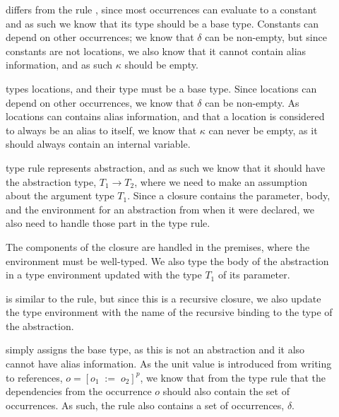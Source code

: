 \documentclass[acmsmall,sigplan]{acmart}
\begin{document}
\begin{description}
\item[] differs from the rule , since
  most occurrences can evaluate to a constant and as such we know that
  its type should be a base type. Constants can depend on other
  occurrences; we know that $\delta$ can be non-empty, but since
  constants are not locations, we also know that it cannot contain
  alias information, and as such $\kappa$ should be empty.

\item[] types locations, and their type must be a base
  type. Since locations can depend on other occurrences, we know that
  $\delta$ can be non-empty.  As locations can contains alias
  information, and that a location is considered to always be an alias
  to itself, we know that $\kappa$ can never be empty, as it should
  always contain an internal variable.

	\item[] type rule represents abstraction, and as
          such we know that it should have the abstraction type,
          $T_1\rightarrow T_2$, where we need to make an assumption
          about the argument type $T_1$. 
		Since a closure contains the parameter, body, and the
                environment for an abstraction from when it were
                declared, we also need to handle those part in the
                type rule.
                
		The components of the closure are handled in the
                premises, where the environment must be well-typed.
                We also type the body of the abstraction in a type
                environment updated with the type $T_1$ of its
                parameter.

	\item[] is similar to the
           rule, but since this is a recursive closure,
          we also update the type environment with the
          name of the recursive binding to the type of the
          abstraction. 

	\item[] simply assigns the base type, as this is
          not an abstraction and it also cannot have alias
          information. As the unit value is introduced from writing to
          references, $o=[o_1\;:=\;o_2]^p$, we know that from the type
          rule  that the dependencies from the
          occurrence $o$ should also contain the set of occurrences. 
		As such, the  rule also contains a set of
                occurrences, $\delta$. 
\end{description}
\end{document}
